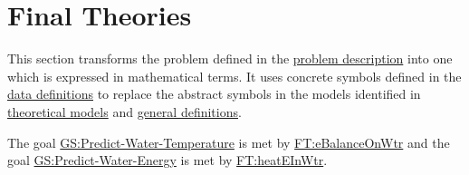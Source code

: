 \documentclass[12pt]{article}
\begin{document}

\section{Final Theories}
\label{Sec:FTs}
This section transforms the problem defined in the \hyperref[Sec:ProbDesc]{problem description} into one which is expressed in mathematical terms. It uses concrete symbols defined in the \hyperref[Sec:DDs]{data definitions} to replace the abstract symbols in the models identified in \hyperref[Sec:BTs]{theoretical models} and \hyperref[Sec:RefndTheories]{general definitions}.

The goal \hyperref[waterTempGS]{GS:Predict-Water-Temperature} is met by \hyperref[FT:eBalanceOnWtr]{FT:eBalanceOnWtr} and the goal \hyperref[waterEnergyGS]{GS:Predict-Water-Energy} is met by \hyperref[FT:heatEInWtr]{FT:heatEInWtr}.

\end{document}
